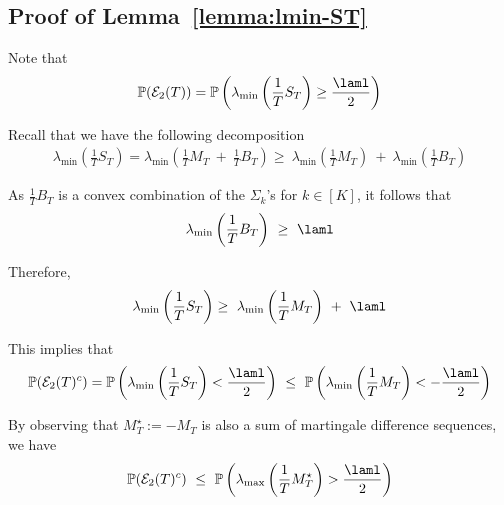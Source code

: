 \documentclass[11pt,letterpaper]{article}
\newcommand{\Prob}{\mathbb{P}}
\newcommand{\Etwo}{\mathcal{E}_2(T)}
\theoremstyle{plain}
\theoremstyle{definition}  %
\begin{document}
\subsection*{Proof of Lemma~\ref{lemma:lmin-ST}}

\noindent Note that
\begin{align*}
    \Prob(\Etwo) = \Prob\left( \lambda_{\min} \left ( \frac{1}{T}S_T \right) \geq \frac{\laml}{2} \right)
\end{align*}

\noindent Recall that we have the following decomposition
\begin{align*}
    \lambda_{\min} \left ( \frac{1}{T}S_T \right)
     =  \lambda_{\min} \left ( \frac{1}{T}M_T \ + \ \frac{1}{T}B_T \right)
     \geq \ \lambda_{\min} \left( \frac{1}{T}M_T  \right) \ + \ \lambda_{\min} \left(\frac{1}{T}B_T \right)
\end{align*}

\noindent As $\frac{1}{T} B_T$ is a convex combination of the $\Sigma_k$'s for $k \in [K]$, it follows that
\begin{align*}
    \lambda_{\min} \left(\frac{1}{T}B_T \right) \ \geq \ \laml
\end{align*}

\noindent Therefore, 
\begin{align*}
   \lambda_{\min} \left ( \frac{1}{T}S_T \right) 
   \geq   \ \lambda_{\min} \left( \frac{1}{T}M_T  \right) \ + \ \laml
\end{align*}

\noindent This implies that
\begin{align*}
   \Prob(\Etwo^c) = \Prob \left(\lambda_{\min} \left ( \frac{1}{T}S_T \right) < \frac{\laml}{2} \right)
   \ \leq \ \Prob \left(\lambda_{\min} \left ( \frac{1}{T}M_T \right) < -\frac{\laml}{2} \right)
\end{align*}

\noindent By observing that $M^\star_T :=-M_T$ is also a sum of martingale difference sequences, we have
\begin{align}
    \Prob(\Etwo^c)  \ \leq \  \Prob \left(\lambda_{\max} \left ( \frac{1}{T}M^\star_T \right) > \frac{\laml}{2} \right)
\end{align}
\end{document}
